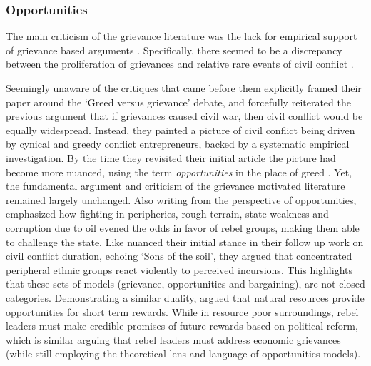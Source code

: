 
\subsubsection{Opportunities} \label{Opportunities}

The main criticism of the grievance literature was the lack for empirical
support of grievance based arguments \citep{Oberschall_1978, Brush_1996}.
Specifically, there seemed to be a discrepancy between the proliferation of
grievances and relative rare events of civil conflict \citep{Snyder_1972,
TillyCharles1978Fmtr, Skocpol_1979}. 

Seemingly unaware of the critiques that came before them \citet{Collier2004}
explicitly framed their paper around the `Greed versus grievance' debate, and
forcefully reiterated the previous argument that if grievances caused civil war,
then civil conflict would be equally widespread. Instead, they painted a picture
of civil conflict being driven by cynical and greedy conflict entrepreneurs,
backed by a systematic empirical investigation. By the time they revisited their
initial article the picture had become more nuanced, using the term
\textit{opportunities} in the place of greed \citep{Collier2009}. Yet, the
fundamental argument and criticism of the grievance motivated literature
remained largely unchanged. Also writing from the perspective of opportunities,
\citet{Fearon2003} emphasized how fighting in peripheries, rough terrain, state
weakness and corruption due to oil evened the odds in favor of rebel groups,
making them able to challenge the state. Like \citet{Collier2009}
\citet{Fearon_2004} nuanced their initial stance in their follow up work on
civil conflict duration, echoing \citet{WeinerMyron1978SotS} `Sons of the soil',
they argued that concentrated peripheral ethnic groups react violently to
perceived incursions. This highlights that these sets of models (grievance,
opportunities and bargaining), are not closed categories. Demonstrating a
similar duality, \citet{Weinstein_2005} argued that natural resources provide
opportunities for short term rewards. While in resource poor surroundings, rebel
leaders must make credible promises of future rewards based on political reform,
which is similar arguing that rebel leaders must address economic grievances
(while still employing the theoretical lens and language of opportunities
models).

